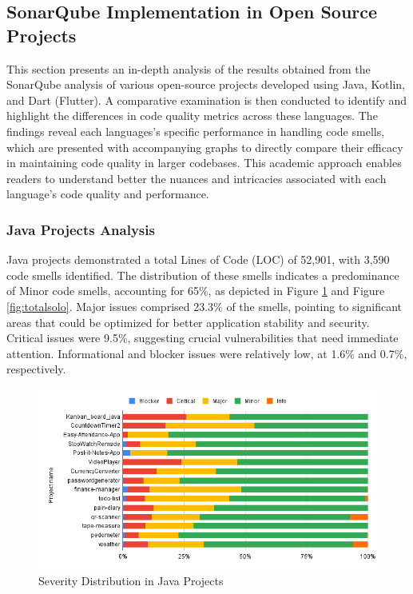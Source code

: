 \subsection{SonarQube Implementation in Open Source Projects}
This section presents an in-depth analysis of the results obtained from the SonarQube analysis of various open-source projects developed using Java, Kotlin, and Dart (Flutter). A comparative examination is then conducted to identify and highlight the differences in code quality metrics across these languages. The findings reveal each languages's specific performance in handling code smells, which are presented with accompanying graphs to directly compare their efficacy in maintaining code quality in larger codebases. This academic approach enables readers to understand better the nuances and intricacies associated with each language's code quality and performance.
\subsubsection{Java Projects Analysis}
Java projects demonstrated a total Lines of Code (LOC) of 52,901, with 3,590 code smells identified. The distribution of these smells indicates a predominance of Minor code smells, accounting for 65\%, as depicted in Figure \ref{fig:javasolo} and Figure \ref{fig:totalsolo}. Major issues comprised 23.3\% of the smells, pointing to significant areas that could be optimized for better application stability and security. Critical issues were 9.5\%, suggesting crucial vulnerabilities that need immediate attention. Informational and blocker issues were relatively low, at 1.6\% and 0.7\%, respectively.

\begin{figure}[htbp]
    \centering
    \includegraphics[scale = 0.58]{img/JAVASOLO.png}
    \caption{Severity Distribution in Java Projects}
    \label{fig:javasolo}
\end{figure}

